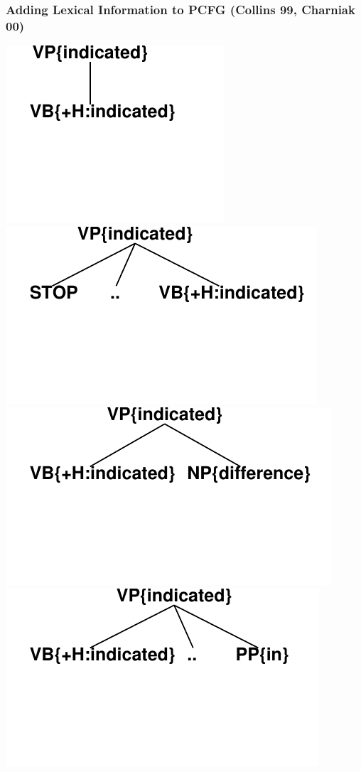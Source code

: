 \begin{frame}
\frametitle{Adding Lexical Information to PCFG {\footnotesize (Collins 99, Charniak 00)}}
\begin{center}
  \includegraphics[scale=.5]{figures/bilexicalcfg1} \ \includegraphics[scale=.5]{figures/bilexicalcfg2} \ \includegraphics[scale=.5]{figures/bilexicalcfg3} 
\\ 
 \includegraphics[scale=.5]{figures/bilexicalcfg4} \

\end{center}
\end{frame}
